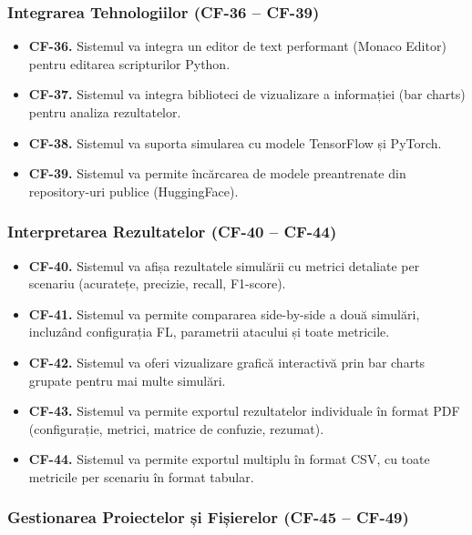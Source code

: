 \documentclass[../../main.tex]{subfiles}
\begin{document}
        \subsubsection{Integrarea Tehnologiilor (CF-36 -- CF-39)}

        \begin{itemize}
            \item \textbf{CF-36.} Sistemul va integra un editor de text performant (Monaco Editor) pentru editarea scripturilor Python.
            \item \textbf{CF-37.} Sistemul va integra biblioteci de vizualizare a informației (bar charts) pentru analiza rezultatelor.
            \item \textbf{CF-38.} Sistemul va suporta simularea cu modele TensorFlow și PyTorch.
            \item \textbf{CF-39.} Sistemul va permite încărcarea de modele preantrenate din repository-uri publice (HuggingFace).
        \end{itemize}

        \subsubsection{Interpretarea Rezultatelor (CF-40 -- CF-44)}

        \begin{itemize}
            \item \textbf{CF-40.} Sistemul va afișa rezultatele simulării cu metrici detaliate per scenariu (acuratețe, precizie, recall, F1-score).
            \item \textbf{CF-41.} Sistemul va permite compararea side-by-side a două simulări, incluzând configurația FL, parametrii atacului și toate metricile.
            \item \textbf{CF-42.} Sistemul va oferi vizualizare grafică interactivă prin bar charts grupate pentru mai multe simulări.
            \item \textbf{CF-43.} Sistemul va permite exportul rezultatelor individuale în format PDF (configurație, metrici, matrice de confuzie, rezumat).
            \item \textbf{CF-44.} Sistemul va permite exportul multiplu în format CSV, cu toate metricile per scenariu în format tabular.
        \end{itemize}

        \subsubsection{Gestionarea Proiectelor și Fișierelor (CF-45 -- CF-49)}
\end{document}
